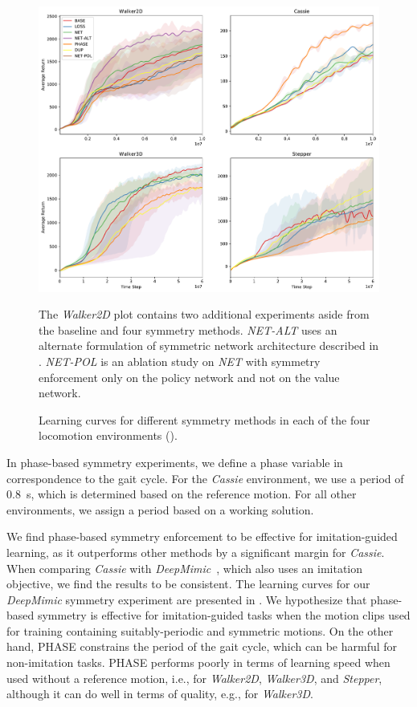 \begin{figure}[tbh]
  \centering
  \includegraphics[width=\columnwidth]{symmetry_figures/LearningCurves.pdf}
      \caption{Learning curves for different symmetry methods in each of the four locomotion environments ().}{The \textit{Walker2D} plot contains two additional experiments aside from the baseline and four symmetry methods.  \textit{NET-ALT} uses an alternate formulation of symmetric network architecture described in .  \textit{NET-POL} is an ablation study on \textit{NET} with symmetry enforcement only on the policy network and not on the value network.}
  \label{fig:learning-curves}
\end{figure}

  In phase-based symmetry experiments, 
we define a phase variable in correspondence to the gait cycle.  
For the \textit{Cassie} environment, we use a period of 0.8~s, 
which is determined based on the reference motion.  
For all other environments, we assign a period based on a working solution.

We find phase-based symmetry enforcement to be effective for imitation-guided learning, 
as it outperforms other methods by a significant margin for \textit{Cassie}.  
When comparing \textit{Cassie} with \textit{DeepMimic}~\cite{2018-TOG-deepMimic}, 
which also uses an imitation objective, we find the results to be consistent.  
The learning curves for our \textit{DeepMimic} symmetry experiment are presented in .  
We hypothesize that phase-based symmetry is effective for imitation-guided tasks when
the motion clips used for training containing suitably-periodic and symmetric motions.  
On the other hand, PHASE constrains the period of the gait cycle, 
which can be harmful for non-imitation tasks. 
PHASE performs poorly in terms of learning speed 
when used without a reference motion, i.e., 
for \textit{Walker2D}, \textit{Walker3D}, and \textit{Stepper}, although
it can do well in terms of quality, e.g., for \textit{Walker3D}.

